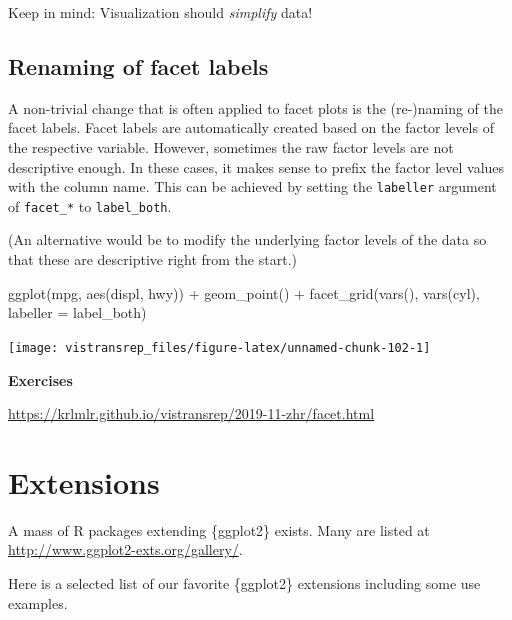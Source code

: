 \documentclass[]{book}
\newenvironment{Shaded}{}{}
\newcommand{\DataTypeTok}[1]{#1}
\newcommand{\KeywordTok}[1]{\textcolor[rgb]{0.00,0.00,1.00}{#1}}
\newcommand{\NormalTok}[1]{#1}
\newcommand{\OperatorTok}[1]{#1}
\newcommand{\StringTok}[1]{\textcolor[rgb]{0.00,0.50,0.50}{#1}}
\begin{document}
Keep in mind: Visualization should \emph{simplify} data!

\hypertarget{renaming-of-facet-labels}{%
\subsection{Renaming of facet labels}\label{renaming-of-facet-labels}}

A non-trivial change that is often applied to facet plots is the (re-)naming of the facet labels.
Facet labels are automatically created based on the factor levels of the respective variable.
However, sometimes the raw factor levels are not descriptive enough.
In these cases, it makes sense to prefix the factor level values with the column name.
This can be achieved by setting the \texttt{labeller} argument of \texttt{facet\_*} to \texttt{label\_both}.

(An alternative would be to modify the underlying factor levels of the data so that these are descriptive right from the start.)

\begin{Shaded}
\begin{Highlighting}[]
\KeywordTok{ggplot}\NormalTok{(mpg, }\KeywordTok{aes}\NormalTok{(displ, hwy)) }\OperatorTok{+}
\StringTok{  }\KeywordTok{geom_point}\NormalTok{() }\OperatorTok{+}
\StringTok{  }\KeywordTok{facet_grid}\NormalTok{(}\KeywordTok{vars}\NormalTok{(), }\KeywordTok{vars}\NormalTok{(cyl), }\DataTypeTok{labeller =}\NormalTok{ label_both)}
\end{Highlighting}
\end{Shaded}

\begin{flushright}\texttt{[image: vistransrep\_files/figure-latex/unnamed-chunk-102-1]} \end{flushright}

\textbf{Exercises}

\url{https://krlmlr.github.io/vistransrep/2019-11-zhr/facet.html}

\hypertarget{extensions}{%
\section{Extensions}\label{extensions}}

A mass of R packages extending \{ggplot2\} exists.
Many are listed at \url{http://www.ggplot2-exts.org/gallery/}.

Here is a selected list of our favorite \{ggplot2\} extensions including some use examples.
\end{document}
